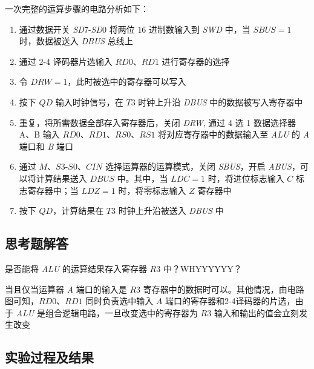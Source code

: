         \par 一次完整的运算步骤的电路分析如下：
        \begin{enumerate}
            \item 通过数据开关 \textit{SD}7-\textit{SD}0 将两位 $16$ 进制数输入到 \textit{SWD} 中，当 $SBUS = 1$ 时，数据被送入 \textit{DBUS} 总线上
            \item 通过 2-4 译码器片选输入 $RD0$、$RD1$ 进行寄存器的选择
            \item 令 $DRW = 1$，此时被选中的寄存器可以写入
            \item 按下 $QD$ 输入时钟信号，在 $T3$ 时钟上升沿 \textit{DBUS} 中的数据被写入寄存器中
            \item 重复，将所需数据全部存入寄存器后，关闭 \textit{DRW}, 通过 4 选 1 数据选择器 A、B 输入 $RD0$、$RD1$、$RS0$、$RS1$ 将对应寄存器中的数据输入至 \textit{ALU} 的 \textit{A} 端口和 \textit{B} 端口
            \item 通过 $M$、$S3$-$S0$、$CIN$ 选择运算器的运算模式，关闭 \textit{SBUS}，开启 \textit{ABUS}，可以将计算结果送入 $DBUS$ 中。其中，当 $LDC = 1$ 时，将进位标志输入 $C$ 标志寄存器中；当 $LDZ = 1$ 时，将零标志输入 $Z$ 寄存器中
            \item 按下 $QD$，计算结果在 $T3$ 时钟上升沿被送入 \textit{DBUS} 中  
        \end{enumerate}

    \subsection{思考题解答}
        \begin{problem}
            是否能将 \textit{ALU} 的运算结果存入寄存器 $R3$ 中？WHYYYYYY？
        \end{problem}
        \begin{solution}
            当且仅当运算器 \textit{A} 端口的输入是 $R3$ 寄存器中的数据时可以。其他情况，由电路图可知，$RD0$、$RD1$ 同时负责选中输入 $A$ 端口的寄存器和2-4译码器的片选，由于 \textit{ALU} 是组合逻辑电路，一旦改变选中的寄存器为 $R3$ 输入和输出的值会立刻发生改变
        \end{solution}

    \subsection{实验过程及结果}
